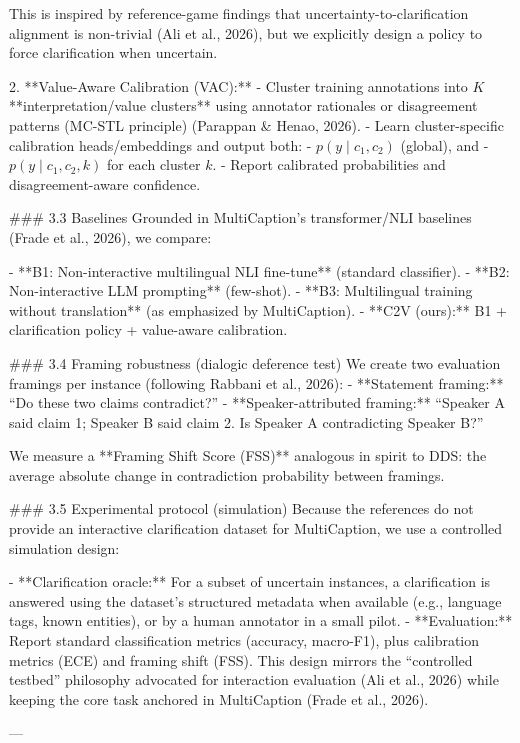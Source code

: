    This is inspired by reference-game findings that uncertainty-to-clarification alignment is non-trivial (Ali et al., 2026), but we explicitly design a policy to force clarification when uncertain.

2. **Value-Aware Calibration (VAC):**  
   - Cluster training annotations into \(K\) **interpretation/value clusters** using annotator rationales or disagreement patterns (MC-STL principle) (Parappan & Henao, 2026).  
   - Learn cluster-specific calibration heads/embeddings and output both:
     - \(p(y \mid c_1,c_2)\) (global), and  
     - \(p(y \mid c_1,c_2, k)\) for each cluster \(k\).  
   - Report calibrated probabilities and disagreement-aware confidence.

### 3.3 Baselines  
Grounded in MultiCaption’s transformer/NLI baselines (Frade et al., 2026), we compare:

- **B1: Non-interactive multilingual NLI fine-tune** (standard classifier).  
- **B2: Non-interactive LLM prompting** (few-shot).  
- **B3: Multilingual training without translation** (as emphasized by MultiCaption).  
- **C2V (ours):** B1 + clarification policy + value-aware calibration.

### 3.4 Framing robustness (dialogic deference test)  
We create two evaluation framings per instance (following Rabbani et al., 2026):  
- **Statement framing:** “Do these two claims contradict?”  
- **Speaker-attributed framing:** “Speaker A said claim 1; Speaker B said claim 2. Is Speaker A contradicting Speaker B?”  

We measure a **Framing Shift Score (FSS)** analogous in spirit to DDS: the average absolute change in contradiction probability between framings.

### 3.5 Experimental protocol (simulation)  
Because the references do not provide an interactive clarification dataset for MultiCaption, we use a controlled simulation design:

- **Clarification oracle:** For a subset of uncertain instances, a clarification is answered using the dataset’s structured metadata when available (e.g., language tags, known entities), or by a human annotator in a small pilot.  
- **Evaluation:** Report standard classification metrics (accuracy, macro-F1), plus calibration metrics (ECE) and framing shift (FSS).  
This design mirrors the “controlled testbed” philosophy advocated for interaction evaluation (Ali et al., 2026) while keeping the core task anchored in MultiCaption (Frade et al., 2026).

---

